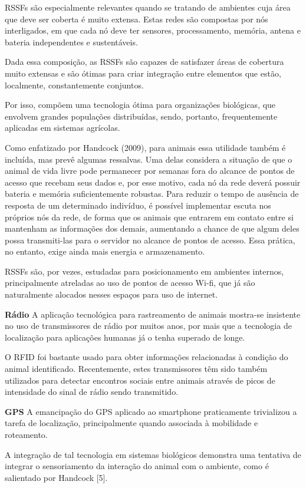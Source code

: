RSSFs são especialmente relevantes quando se tratando de ambientes cuja área que deve ser coberta é muito extensa. Estas redes são compostas por nós interligados, em que cada nó deve ter sensores, processamento, memória, antena e bateria independentes e sustentáveis.

Dada essa composição, as RSSFs são capazes de satisfazer áreas de cobertura muito extensas e são ótimas para criar integração entre elementos que estão, localmente, constantemente conjuntos.

Por isso, compõem uma tecnologia ótima para organizações biológicas, que envolvem grandes populações distribuídas, sendo, portanto, frequentemente aplicadas em sistemas agrícolas.

Como enfatizado por Handcock (2009), para animais essa utilidade também é incluída, mas prevê algumas ressalvas. Uma delas considera a situação de que o animal de vida livre pode permanecer por semanas fora do alcance de pontos de acesso que recebam seus dados e, por esse motivo, cada nó da rede deverá possuir bateria e memória suficientemente robustas. Para reduzir o tempo de ausência de resposta de um determinado indivíduo, é possível implementar escuta nos próprios nós da rede, de forma que os animais que entrarem em contato entre si mantenham as informações dos demais, aumentando a chance de que algum deles possa transmiti-las para o servidor no alcance de pontos de acesso. Essa prática, no entanto, exige ainda mais energia e armazenamento.

RSSFs são, por vezes, estudadas para posicionamento em ambientes internos, principalmente atreladas ao uso de pontos de acesso Wi-fi, que já são naturalmente alocados nesses espaços para uso de internet.

\textbf{Rádio}
A aplicação tecnológica para rastreamento de animais mostra-se insistente no uso de transmissores de rádio por muitos anos, por mais que a tecnologia de localização para aplicações humanas já o tenha superado de longe.

O RFID foi bastante usado para obter informações relacionadas à condição do animal identificado. Recentemente, estes transmissores têm sido também utilizados para detectar encontros sociais entre animais através de picos de intensidade do sinal de rádio sendo transmitido.

\textbf{GPS}
A emancipação do GPS aplicado ao smartphone praticamente trivializou a tarefa de localização, principalmente quando associada à mobilidade e roteamento.

A integração de tal tecnologia em sistemas biológicos demonstra uma tentativa de integrar o sensoriamento da interação do animal com o ambiente, como é salientado por Handcock [5].

